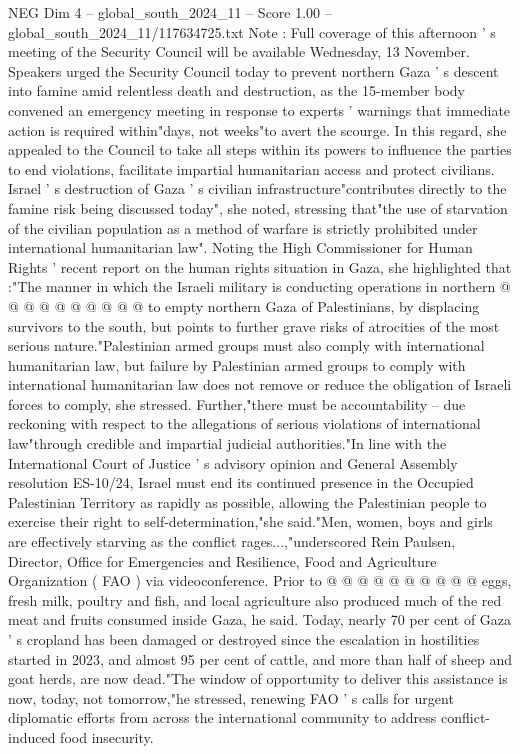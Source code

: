 \begin{textsample}{NEG Dim 4 – global\_south\_2024\_11 – Score 1.00 – global\_south\_2024\_11/117634725.txt}  \label{ex:f4_neg_174}
Note : Full coverage of this afternoon ' s meeting of the Security Council will be available Wednesday, 13 November.
Speakers urged the Security Council today to prevent northern Gaza ' s descent into famine amid relentless death and destruction, as the 15-member body convened an emergency meeting in response to experts ' warnings that immediate action is required within"days, not weeks"to avert the scourge.
In this regard, she appealed to the Council to take all steps within its powers to influence the parties to end violations, facilitate impartial humanitarian access and protect civilians.
Israel ' s destruction of Gaza ' s civilian infrastructure"contributes directly to the famine risk being discussed today", she noted, stressing that"the use of starvation of the civilian population as a method of warfare is strictly prohibited under international humanitarian law".
Noting the High Commissioner for Human Rights ' recent report on the human rights situation in Gaza, she highlighted that :"The manner in which the Israeli military is conducting operations in northern @ @ @ @ @ @ @ @ @ @ to empty northern Gaza of Palestinians, by displacing survivors to the south, but points to further grave risks of atrocities of the most serious nature."Palestinian armed groups must also comply with international humanitarian law, but failure by Palestinian armed groups to comply with international humanitarian law does not remove or reduce the obligation of Israeli forces to comply, she stressed.
Further,"there must be accountability -- due reckoning with respect to the allegations of serious violations of international law"through credible and impartial judicial authorities."In line with the International Court of Justice ' s advisory opinion and General Assembly resolution ES-10/24, Israel must end its continued presence in the Occupied Palestinian Territory as rapidly as possible, allowing the Palestinian people to exercise their right to self-determination,"she said."Men, women, boys and girls are effectively starving as the conflict rages...,"underscored Rein Paulsen, Director, Office for Emergencies and Resilience, Food and Agriculture Organization ( FAO ) via videoconference.
Prior to @ @ @ @ @ @ @ @ @ @ eggs, fresh milk, poultry and fish, and local agriculture also produced much of the red meat and fruits consumed inside Gaza, he said.
Today, nearly 70 per cent of Gaza ' s cropland has been damaged or destroyed since the escalation in hostilities started in 2023, and almost 95 per cent of cattle, and more than half of sheep and goat herds, are now dead."The window of opportunity to deliver this assistance is now, today, not tomorrow,"he stressed, renewing FAO ' s calls for urgent diplomatic efforts from across the international community to address conflict-induced food insecurity.

\end{textsample}
